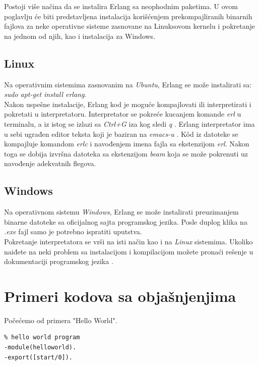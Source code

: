 \documentclass[a4paper]{article}
\begin{document}
{Postoji više načina da se instalira Erlang sa neophodnim paketima.
U ovom poglavlju će biti predstavljena instalacija korišćenjem prekompajliranih binarnih fajlova 
za neke operativne sisteme zasnovane na Linuksovom kernelu i pokretanje na jednom od njih, kao i instalacija za Windows.

\subsection{Linux}
\label{subsec:instalacijaLinux}

Na operativnim sistemima zasnovanim na {\em Ubuntu}, Erlang se može instalirati sa:
{\em sudo apt-get install erlang}. \\

Nakon uspešne instalacije, Erlang kod je moguće kompajlovati
ili interpretirati i pokretati u interpretatoru.
Interpretator se pokreće kucanjem komande {\em erl} u terminalu, a iz istog
se izlazi sa {\em Ctrl+G} iza kog sledi {\em q} \cite{book_joe}.
Erlang interpretator ima u sebi ugrađen editor teksta koji je baziran na {\em emacs-u} \cite{book_fred}.
K\^od iz datoteke se kompajluje komandom {\em erlc} i navođenjem imena fajla sa ekstenzijom {\em erl}.
Nakon toga se dobija izvršna datoteka sa ekstenzijom {\em beam} koja se može
pokrenuti uz navođenje adekvatnih flegova. 

\subsection{Windows}
\label{subsec:instalacijaWindows}
Na operativnom sistemu {\em Windows}, Erlang se može instalirati preuzimanjem binarne datoteke sa oficijalnog sajta \cite{sajt} programskog jezika. Posle duplog klika na {\em .exe} fajl samo je potrebno ispratiti uputstva. \\

Pokretanje interpretatora se vrši na isti način kao i na {\em Linux} sistemima. Ukoliko naiđete na neki problem sa instalacijom i kompilacijom možete pronaći rešenje u dokumentaciji programskog jezika \cite{sajt}.

\section{Primeri kodova sa objašnjenjima}
\label{sec:primeri}
Počećemo od primera "Hello World".  
\begin{verbatim}
% hello world program
-module(helloworld). 
-export([start/0]). 


\end{verbatim}}
\end{document}

